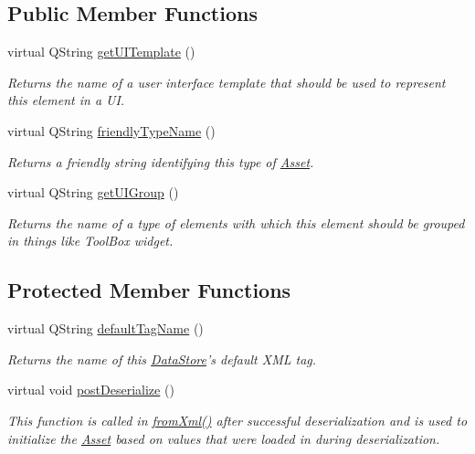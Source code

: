 \subsection*{Public Member Functions}
\begin{DoxyCompactItemize}
\item 
\hypertarget{class_picto_1_1_variable_aae536e42c9e88e430da6b5cd298ea98a}{virtual Q\-String \hyperlink{class_picto_1_1_variable_aae536e42c9e88e430da6b5cd298ea98a}{get\-U\-I\-Template} ()}\label{class_picto_1_1_variable_aae536e42c9e88e430da6b5cd298ea98a}

\begin{DoxyCompactList}\small\item\em Returns the name of a user interface template that should be used to represent this element in a U\-I. \end{DoxyCompactList}\item 
virtual Q\-String \hyperlink{class_picto_1_1_variable_abf83dc0e4cfbfe89c43720eca1c49664}{friendly\-Type\-Name} ()
\begin{DoxyCompactList}\small\item\em Returns a friendly string identifying this type of \hyperlink{class_picto_1_1_asset}{Asset}. \end{DoxyCompactList}\item 
\hypertarget{class_picto_1_1_variable_ab5e5110c067b892a49bbb0830865f32a}{virtual Q\-String \hyperlink{class_picto_1_1_variable_ab5e5110c067b892a49bbb0830865f32a}{get\-U\-I\-Group} ()}\label{class_picto_1_1_variable_ab5e5110c067b892a49bbb0830865f32a}

\begin{DoxyCompactList}\small\item\em Returns the name of a type of elements with which this element should be grouped in things like Tool\-Box widget. \end{DoxyCompactList}\end{DoxyCompactItemize}
\subsection*{Protected Member Functions}
\begin{DoxyCompactItemize}
\item 
virtual Q\-String \hyperlink{class_picto_1_1_variable_a7a29c48c2d30d39cfe6a6e8abf97261d}{default\-Tag\-Name} ()
\begin{DoxyCompactList}\small\item\em Returns the name of this \hyperlink{class_picto_1_1_data_store}{Data\-Store}'s default X\-M\-L tag. \end{DoxyCompactList}\item 
virtual void \hyperlink{class_picto_1_1_variable_a447e12ef138cdd99ae9ba870ed3b5174}{post\-Deserialize} ()
\begin{DoxyCompactList}\small\item\em This function is called in \hyperlink{class_picto_1_1_asset_a8bed4da09ecb1c07ce0dab313a9aba67}{from\-Xml()} after successful deserialization and is used to initialize the \hyperlink{class_picto_1_1_asset}{Asset} based on values that were loaded in during deserialization. \end{DoxyCompactList}\end{DoxyCompactItemize}
